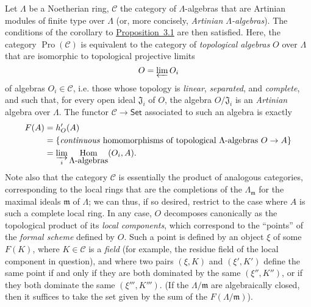 \documentclass{article}
\renewcommand{\cal}[1]{{\mathcal{#1}}}
\newcommand{\fk}[1]{{\mathfrak{#1}}}
\newcommand{\Set}{\mathsf{Set}}
\DeclareMathOperator{\Hom}{Hom}
\DeclareMathOperator{\Pro}{Pro}
\newcommand{\oldpage}[1]{\marginpar{\footnotesize$\Big\vert$ \textit{p.~#1}}}
\begin{document}
Let $\Lambda$ be a Noetherian ring, $\cal{C}$ the category of $\Lambda$-algebras that are Artinian modules of finite type over $\Lambda$ (or, more concisely,
\oldpage{195-07}
\emph{Artinian $\Lambda$-algebras}).
The conditions of the corollary to \hyperref[A.3-proposition1]{Proposition~3.1} are then satisfied.
Here, the category $\Pro(\cal{C})$ is equivalent to the category of \emph{topological algebras} $O$ over $\Lambda$ that are isomorphic to topological projective limits
\[
  O = \varprojlim O_i
\]
of algebras $O_i\in\cal{C}$, i.e. those whose topology is \emph{linear}, \emph{separated}, and \emph{complete}, and such that, for every open ideal $\fk{J}_i$ of $O$, the algebra $O/\fk{J}_i$ is an \emph{Artinian} algebra over $\Lambda$.
The functor $\cal{C}\to\Set$ associated to such an algebra is exactly
\[
  \begin{aligned}
    F(A)
    &= h'_{O}(A)
  \\&= \{\mbox{\emph{continuous} homomorphisms of topological $\Lambda$-algebras $O\to A$}\}
  \\&= \varinjlim_i \Hom_{\mbox{$\Lambda$-algebras}}(O_i,A).
  \end{aligned}
\]
Note also that the category $\cal{C}$ is essentially the product of analogous categories, corresponding to the local rings that are the completions of the $\Lambda_{\fk{m}}$ for the maximal ideals $\fk{m}$ of $\Lambda$;
we can thus, if so desired, restrict to the case where $A$ is such a complete local ring.
In any case, $O$ decomposes canonically as the topological product of its \emph{local components}, which correspond to the ``points'' of the \emph{formal scheme} \cite{2} defined by $O$.
Such a point is defined by an object $\xi$ of some $F(K)$, where $K\in\cal{C}$ is a \emph{field} (for example, the residue field of the local component in question), and where two pairs $(\xi,K)$ and $(\xi',K')$ define the same point if and only if they are both dominated by the same $(\xi'',K'')$, or if they both dominate the same $(\xi''',K''')$.
(If the $\Lambda/\fk{m}$ are algebraically closed, then it suffices to take the set given by the sum of the $F(\Lambda/\fk{m})$).
\end{document}

